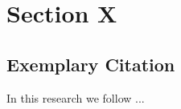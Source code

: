 \clearpage
\section{Section X}
\label{sec:Section_Name_X}

\subsection{Exemplary Citation}
\label{subsec:Section_Name_X/cite}


In this research we follow \cite{Ketter2016}...


